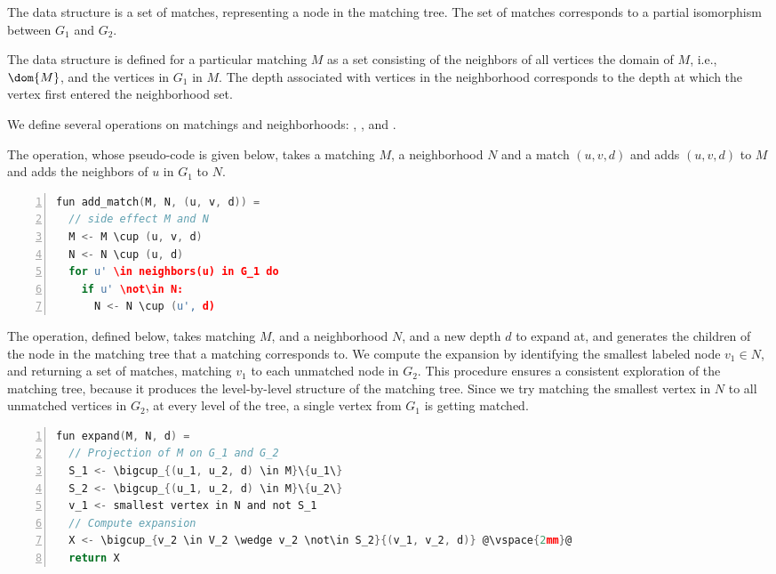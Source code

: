 The  data structure is a set of matches, representing a
node in the matching tree.
%
The set of matches corresponds to a partial isomorphism
between $G_1$ and $G_2$.
%

The  data structure is defined for a particular
matching $M$ as a set consisting of the neighbors of all vertices
the domain of $M$, i.e., $\dom{M}$, and the vertices in $G_1$ in $M$.
%
The depth associated with vertices in the neighborhood corresponds
to the depth at which the vertex first entered the neighborhood set.

We define several operations on  matchings and neighborhoods:
, , and .

The  operation, whose pseudo-code is given below, takes
a matching $M$, a neighborhood $N$ and a match $(u, v, d)$ and adds 
$(u, v, d)$ to $M$ and adds the neighbors of $u$ in $G_1$ to $N$.
%
\begin{lstlisting}[language=c, numbers=left]
fun add_match(M, N, (u, v, d)) =
  // side effect M and N 
  M <- M \cup (u, v, d)
  N <- N \cup (u, d)
  for u' \in neighbors(u) in G_1 do
    if u' \not\in N:
      N <- N \cup (u', d)
\end{lstlisting}


The  operation, defined below, takes matching $M$,
and a neighborhood $N$, and a new depth $d$ to expand at, and
generates the children
of the node in the matching tree that a matching corresponds to.
%
We compute the expansion by identifying
the smallest labeled node $v_1 \in N$, and returning
a set of matches, matching $v_1$ to each unmatched node in $G_2$.
%
This procedure ensures a consistent exploration of the matching tree,
because it produces the level-by-level structure of the matching tree.
%
Since we try matching the smallest vertex in $N$ to all unmatched vertices in
$G_2$, at every level of the tree, a single vertex from $G_1$ is getting matched.
%
\begin{lstlisting}[language=c, numbers=left]
fun expand(M, N, d) =
  // Projection of M on G_1 and G_2 
  S_1 <- \bigcup_{(u_1, u_2, d) \in M}\{u_1\}
  S_2 <- \bigcup_{(u_1, u_2, d) \in M}\{u_2\}
  v_1 <- smallest vertex in N and not S_1
  // Compute expansion 
  X <- \bigcup_{v_2 \in V_2 \wedge v_2 \not\in S_2}{(v_1, v_2, d)} @\vspace{2mm}@
  return X
\end{lstlisting}

